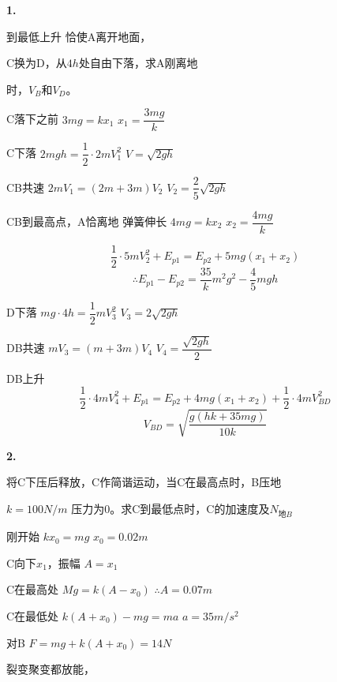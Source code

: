 \textbf{1.}

\begin{problem}
到最低上升 恰使A离开地面，%

C换为D，从$4h$处自由下落，求A刚离地

时，$V_B$和$V_D$。
\begin{solution}
C落下之前 \quad $3mg=kx_1$ \quad $x_1=\dfrac{3mg}{k}$

C下落 \quad $2mgh=\dfrac12\cdot 2mV_1^{2}$ \quad $V=\sqrt{2gh}$ %

CB共速 \quad $2mV_1=(2m+3m)V_2$ \quad $V_2=\dfrac{2}{5}\sqrt{2gh}$

CB到最高点，A恰离地 弹簧伸长 \quad $4mg=kx_2$ \quad $x_2=\dfrac{4mg}{k}$

\[ \frac12\cdot 5mV_2^{2}+E_{p1}=E_{p2}+5mg(x_1+x_2) \]
\[ \therefore E_{p1}-E_{p2}=\frac{35}{k}m^{2}g^{2}-\frac{4}{5}mgh \]

D下落 \quad $mg\cdot 4h=\dfrac12 mV_3^{2}$ \quad $V_3=2\sqrt{2gh}$

DB共速 \quad $mV_3=(m+3m)V_4$ \quad $V_4=\dfrac{\sqrt{2gh}}{2}$

DB上升
\[ \frac12\cdot 4mV_4^{2}+E_{p1}=E_{p2}+4mg(x_1+x_2)+\frac12\cdot 4mV_{BD}^{2} \]
\[ V_{BD}=\sqrt{\frac{g(hk+35mg)}{10k}} \]
\end{solution}
\end{problem}
\textbf{2.}

\begin{problem}
将C下压后释放，C作简谐运动，当C在最高点时，B压地

$k=100\unit{N/m}$ \quad 压力为0。求C到最低点时，C的加速度及$N_{\text{地}B}$
\begin{solution}
刚开始 \quad $kx_0=mg$ \quad $x_0=0.02\unit{m}$

C向下$x_1$，振幅 $A=x_1$

C在最高处 \quad $Mg=k(A-x_0)$ \quad $\therefore A=0.07\unit{m}$

C在最低处 \quad $k(A+x_0)-mg=ma$ \quad $a=35\unit{m/s^2}$

对B \quad $F=mg+k(A+x_0)=14\unit{N}$ %
\end{solution}
\end{problem}
裂变聚变都放能，

